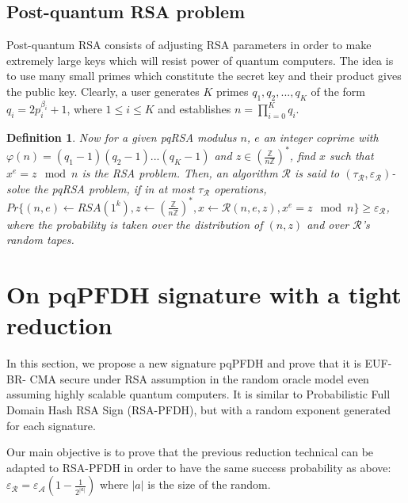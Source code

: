 \documentclass[a4paper,11pt]{article}
\newtheorem{definition}[theorem]{Definition}
\begin{document}
\subsection{Post-quantum RSA problem}\label{sec:one:3}
Post-quantum RSA consists of adjusting RSA parameters in order to make extremely large keys which will resist power of quantum computers. The idea is to use many small primes which constitute the secret key and their product gives the public key. Clearly, a user generates $K$ primes $q_1,q_2,...,q_K$ of the form $q_i=2p_i^{\beta_i}+1$, where $ 1\leq i\leq K$ and establishes $n=\prod_{i=0}^{K}{q_i}$.\\
\begin{definition}
Now for a given pqRSA modulus  $n$, $e$ an integer coprime with $\varphi (n)=(q_1-1)(q_2-1)...(q_K-1)$ and $z \in (\frac{\mathbb{Z}}{n\mathbb{Z}})^{*}$, find $x$ such that $x^{e} = z  \mod n$ is the RSA problem. Then, an algorithm $\mathcal{R}$ is said to $(\tau_{\mathcal{R}} , \varepsilon_{\mathcal{R}} )$-solve the pqRSA
problem, if in at most $\tau_{\mathcal{R}}$ operations, $Pr \lbrace (n,e) \leftarrow RSA(1^{k} ), z \leftarrow (\frac{\mathbb{Z}}{n\mathbb{Z}})^{*} , x \leftarrow \mathcal{R}(n, e, z), x^{e} = z \mod n\rbrace \geq \varepsilon_{\mathcal{R}} $, where the probability is taken over the distribution of $(n, z)$ and over $\mathcal{\mathcal{R}}$'s  random tapes.
\end{definition}

\section{On pqPFDH signature with a tight reduction}\label{sec:three}

In this section,  we propose a new signature pqPFDH and prove that it is EUF-BR- CMA secure under RSA
assumption  in the random oracle model even assuming highly scalable quantum computers. It is similar to Probabilistic Full Domain Hash RSA Sign (RSA-PFDH), but with a random exponent generated for each signature.

Our main objective is to prove that the previous reduction technical can be adapted to RSA-PFDH  in order to have the same success probability as above: $\varepsilon_{\mathcal{R}} = \varepsilon_{\mathcal{A}}(1-\frac{1}{2^{|a|}}) $ where $|a|$ is the size of the random.

\end{document}
